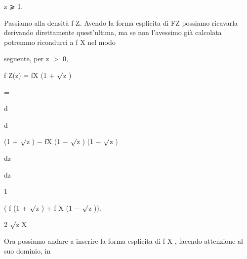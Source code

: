 \documentclass[a4paper,portrait,12pt]{article}
\begin{document}
\begin{flushleft}
z ⩾ 1.
\end{flushleft}





\begin{flushleft}
Passiamo alla densit\`{a} f Z. Avendo la forma esplicita di FZ possiamo ricavarla derivando direttamente quest'ultima, ma se non l'avessimo gi\`{a} calcolata potremmo ricondurci a f X nel modo
\end{flushleft}


\begin{flushleft}
seguente, per z $>$ 0,
\end{flushleft}


\begin{flushleft}
f Z(z) = fX (1 + $\surd$z )
\end{flushleft}


=





\begin{flushleft}
d
\end{flushleft}


\begin{flushleft}
d
\end{flushleft}


\begin{flushleft}
(1 + $\surd$z ) $-$ fX (1 $-$ $\surd$z ) (1 $-$ $\surd$z )
\end{flushleft}


\begin{flushleft}
dz
\end{flushleft}


\begin{flushleft}
dz
\end{flushleft}





1


\begin{flushleft}
( f (1 + $\surd$z ) + f X (1 $-$ $\surd$z )).
\end{flushleft}


\begin{flushleft}
2 $\surd$z X
\end{flushleft}





\begin{flushleft}
Ora possiamo andare a inserire la forma esplicita di f X , facendo attenzione al suo dominio, in
\end{flushleft}
\end{document}
